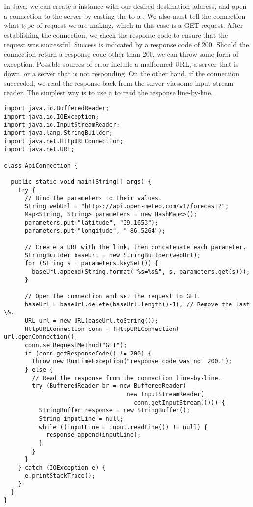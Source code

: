 In Java, we can create a  instance with our desired destination address, and open a connection to the server by casting the  to a . 
We also must tell the connection what type of request we are making, which in this case is a GET request. 
After establishing the connection, we check the response code to ensure that the request was successful. 
Success is indicated by a response code of 200. 
Should the connection return a response code other than 200, we can throw some form of exception. 
Possible sources of error include a malformed URL, a server that is down, or a server that is not responding.
On the other hand, if the connection succeeded, we read the response back from the server via some input stream reader. 
The simplest way is to use a  to read the response line-by-line.

\begin{lstlisting}[language=MyJava]
import java.io.BufferedReader;
import java.io.IOException;
import java.io.InputStreamReader;
import java.lang.StringBuilder;
import java.net.HttpURLConnection;
import java.net.URL;

class ApiConnection {

  public static void main(String[] args) {
    try {
      // Bind the parameters to their values.
      String webUrl = "https://api.open-meteo.com/v1/forecast?";
      Map<String, String> parameters = new HashMap<>();
      parameters.put("latitude", "39.1653");
      parameters.put("longitude", "-86.5264");

      // Create a URL with the link, then concatenate each parameter.
      StringBuilder baseUrl = new StringBuilder(webUrl);
      for (String s : parameters.keySet()) { 
        baseUrl.append(String.format("%s=%s&", s, parameters.get(s))); 
      }
    
      // Open the connection and set the request to GET.
      baseUrl = baseUrl.delete(baseUrl.length()-1); // Remove the last \&.
      URL url = new URL(baseUrl.toString());
      HttpURLConnection conn = (HttpURLConnection) url.openConnection();
      conn.setRequestMethod("GET");
      if (conn.getResponseCode() != 200) {
        throw new RuntimeException("response code was not 200.");
      } else {
        // Read the response from the connection line-by-line.
        try (BufferedReader br = new BufferedReader(
                                   new InputStreamReader(
                                     conn.getInputStream()))) {
          StringBuffer response = new StringBuffer();
          String inputLine = null;
          while ((inputLine = input.readLine()) != null) { 
            response.append(inputLine); 
          }
        }
      }
    } catch (IOException e) {
      e.printStackTrace();
    }
  }
}
\end{lstlisting}


